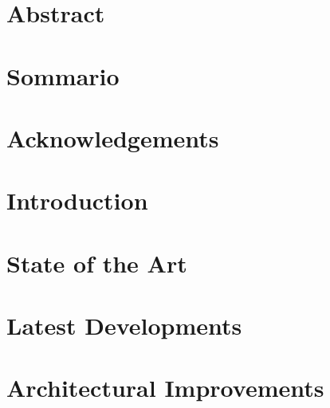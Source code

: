 \documentclass[12pt,a4paper,twoside,openright]{memoir}
\theoremstyle{definition}
\begin{document}
\nonzeroparskip
\frontmatter

%
\chapter{Abstract}

\chapter{Sommario}

\chapter{Acknowledgements}

\newpage
\tableofcontents
\clearpage
\listoffigures
\listoftables
\mainmatter
\pagestyle {ruled}
\chapter{Introduction}
\label{chap:intro}

\chapter{State of the Art}
\label{chap:sota}

\chapter{Latest Developments}
\label{chap:latdel}

\chapter{Architectural Improvements}
\label{chap:arim}

\end{document}
